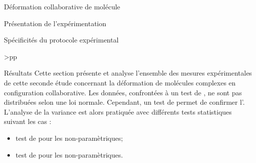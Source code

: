 \documentclass[myfrancais,ngerman,english,french]{mythesis}
\begin{document}
\begin{mychapter}{Déformation collaborative de molécule}
\begin{mysection}{Présentation de l'expérimentation}
\begin{mysubsection}{Spécificités du protocole expérimental}
\begin{mytable}
\begin{mytabular}{>{\bfseries}p{\exptwofirstcolumn}p{\exptwosecondcolumn}}
						\mymiddlerule[\heavyrulewidth]
						 \\
						\mybottomrule
					\end{mytabular}
				\end{mytable}
			\end{mysubsection}
		\end{mysection}
		\begin{mysection}{Résultats}
			Cette section présente et analyse l'ensemble des mesures expérimentales de cette seconde étude concernant la déformation de molécules complexes en configuration collaborative.
			Les données, confrontées à un test de , ne sont pas distribuées selon une loi normale.
			Cependant, un test de  permet de confirmer l'.
			L'analyse de la variance est alors pratiquée avec différents tests statistiques suivant les cas :
			\begin{itemize}
				\item test de  pour les  non-paramètriques;
				\item test de  pour les  non-paramètriques.

\end{itemize}
\end{mysection}
\end{mychapter}
\end{document}
